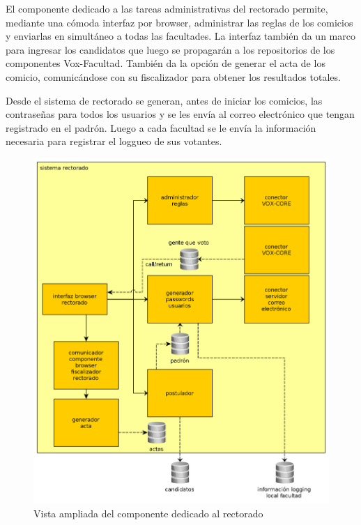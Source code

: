 El componente dedicado a las tareas administrativas del rectorado permite, mediante una cómoda interfaz por browser, administrar las reglas de los comicios y enviarlas en simultáneo a todas las facultades. La interfaz también da un marco para ingresar los candidatos que luego se propagarán a los repositorios de los componentes Vox-Facultad. También da la opción de generar el acta de los comicio, comunicándose con su fiscalizador para obtener los resultados totales.


Desde el sistema de rectorado se generan, antes de iniciar los comicios, las contraseñas para todos los usuarios y se les envía al correo electrónico que tengan registrado en el padrón. Luego a cada facultad se le envía la información necesaria para registrar el loggueo de sus votantes.

\begin{figure}[H]
	\begin{center}
		\includegraphics[scale=0.26]{../diagramas/sistemaRectorado.png}
		\caption{Vista ampliada del componente dedicado al rectorado}
	\end{center} 
\end{figure} 

